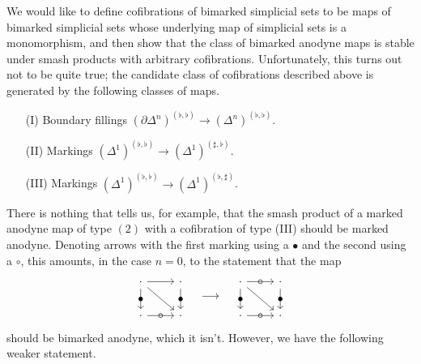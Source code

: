 \documentclass[main.tex]{subfiles}
\begin{document}
We would like to define cofibrations of bimarked simplicial sets to be maps of bimarked simplicial sets whose underlying map of simplicial sets is a monomorphism, and then show that the class of bimarked anodyne maps is stable under smash products with arbitrary cofibrations. Unfortunately, this turns out not to be quite true; the candidate class of cofibrations described above is generated by the following classes of maps.
\begin{itemize}
  \item[(I)] Boundary fillings $(\partial \Delta^{n})^{(\flat, \flat)} \to (\Delta^{n})^{(\flat, \flat)}$.

  \item[(II)] Markings $(\Delta^{1})^{(\flat, \flat)} \to (\Delta^{1})^{(\sharp, \flat)}$.

  \item[(III)] Markings $(\Delta^{1})^{(\flat, \flat)} \to (\Delta^{1})^{(\flat, \sharp)}$.
\end{itemize}
There is nothing that tells us, for example, that the smash product of a marked anodyne map of type $(2)$ with a cofibration of type (III) should be marked anodyne. Denoting arrows with the first marking using a $\bullet$ and the second using a $\circ$, this amounts, in the case $n = 0$, to the statement that the map
\begin{equation*}
  \begin{tikzcd}
    \cdot
    \arrow[r]
    \arrow[d, "\bullet" marking]
    \arrow[dr]
    & \cdot
    \arrow[d, "\bullet" marking]
    \\
    \cdot
    \arrow[r, "\circ" marking]
    & \cdot
  \end{tikzcd}
  \quad \longrightarrow \quad
  \begin{tikzcd}
    \cdot
    \arrow[r, "\circ" marking]
    \arrow[d, "\bullet" marking]
    \arrow[dr]
    & \cdot
    \arrow[d, "\bullet" marking]
    \\
    \cdot
    \arrow[r, "\circ" marking]
    & \cdot
  \end{tikzcd}
\end{equation*}
should be bimarked anodyne, which it isn't. However, we have the following weaker statement.
\end{document}
